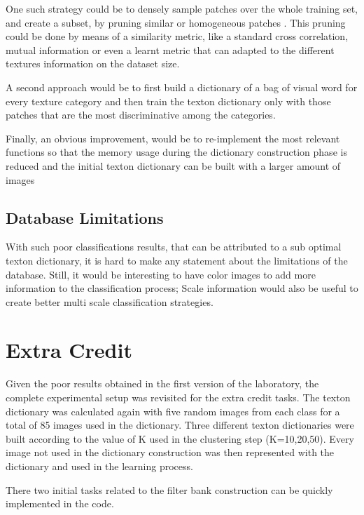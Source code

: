\documentclass[10pt,twocolumn,letterpaper]{article}
\begin{document}
One such strategy could be to densely sample patches over the whole training set, and create a subset,  by pruning similar or homogeneous patches . This pruning could be done by means of a similarity  metric, like a standard cross correlation, mutual information or even a learnt metric that can adapted to the different textures information on the dataset size.

A second approach  would be to first build a dictionary of a bag of visual word  for  every texture category and then train the texton dictionary only with those patches that are the most discriminative among the categories.

Finally, an obvious improvement, would be to re-implement the most relevant functions so that the memory usage during the dictionary construction phase is reduced and the initial texton dictionary can be built with a larger amount of images

\subsection{Database Limitations}
With such poor classifications results, that can be attributed to a sub optimal texton dictionary, it is hard to make any statement about the limitations of the database. Still, it would be interesting to have color images to add more information to the classification process; Scale information would also be useful to create better multi scale classification strategies.


\section{Extra Credit}
Given the poor results obtained in the first version of the laboratory, the complete experimental setup was revisited for the extra credit tasks. The texton dictionary was calculated again with five random images from each class for a total of 85 images used in the dictionary. Three different texton dictionaries were built according to the value of K used in the clustering step (K=10,20,50). Every image not used in the dictionary construction was then represented with the dictionary and used in the learning process.

There two initial tasks related to the filter bank construction can be quickly implemented in the code.
\end{document}
